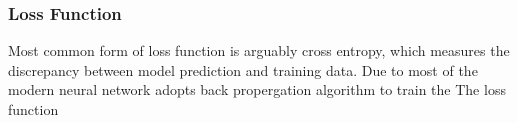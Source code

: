 \subsubsection{Loss Function}

Most common form of loss function is arguably cross entropy, which measures the discrepancy between model prediction and training data. Due to most of the modern neural network adopts back propergation algorithm to train the The loss function 